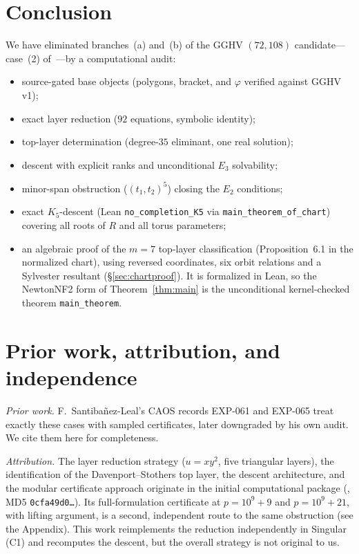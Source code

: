 \documentclass[a4paper,11pt]{article}
\newcommand{\filename}[1]{\texttt{\seqsplit{#1}}}
\theoremstyle{plain}
\theoremstyle{definition}
\theoremstyle{remark}
\begin{document}
\section{Conclusion}\label{sec:conclusion}

We have eliminated branches~(a) and~(b) of the GGHV $(72,108)$ candidate---case~(2) of~\cite[Proposition~4.3]{GGHV}---by a computational audit:
\begin{itemize}[nosep]
\item source-gated base objects (polygons, bracket, and $\varphi$ verified against GGHV v1);
\item exact layer reduction ($92$ equations, symbolic identity);
\item top-layer determination (degree-$35$ eliminant, one real solution);
\item descent with explicit ranks and unconditional $E_3$ solvability;
\item minor-span obstruction ($(t_1,t_2)^5$) closing the $E_2$ conditions;
\item exact $K_5$-descent (Lean \texttt{no\_completion\_K5} via \texttt{main\_theorem\_of\_chart}) covering all roots of $R$ and all torus parameters;
\item an algebraic proof of the $m=7$ top-layer classification (Proposition~6.1 in the normalized chart), using reversed coordinates, six orbit relations and a Sylvester resultant (\S\ref{sec:chartproof}). It is formalized in Lean, so the NewtonNF2 form of Theorem~\ref{thm:main} is the unconditional kernel-checked theorem \texttt{main\_theorem}.
\end{itemize}

\section{Prior work, attribution, and independence}\label{sec:attribution}

\emph{Prior work.} F.~Santiba\~nez-Leal's CAOS records EXP-061 and EXP-065 treat exactly these cases with sampled certificates, later downgraded by his own audit. We cite them here for completeness.

\emph{Attribution.} The layer reduction strategy ($u=xy^2$, five triangular layers), the identification of the Davenport--Stothers top layer, the descent architecture, and the modular certificate approach originate in the initial computational package (\filename{branch\_ab\_elimination.zip}, MD5 \texttt{0cfa49d0\dots}). Its full-formulation certificate at $p=10^9+9$ and $p=10^9+21$, with lifting argument, is a second, independent route to the same obstruction (see the Appendix). This work reimplements the reduction independently in {\sc Singular} (C1) and recomputes the descent, but the overall strategy is not original to us.
\end{document}
